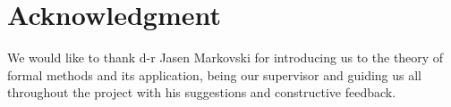 \section*{Acknowledgment}
We would like to thank d-r Jasen Markovski for introducing us to the theory of formal methods and its application, being our supervisor and guiding us all throughout the project with his suggestions and constructive feedback.